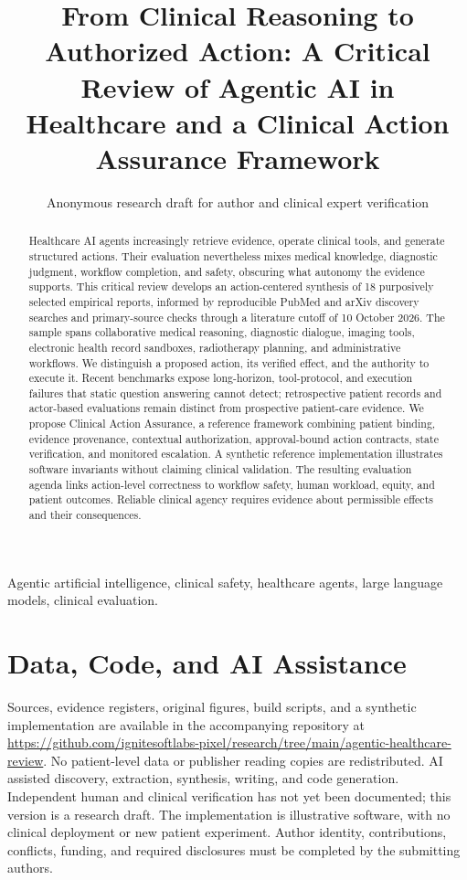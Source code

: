 \documentclass[journal,10pt]{IEEEtran}
\title{From Clinical Reasoning to Authorized Action: A Critical Review of Agentic AI in Healthcare and a Clinical Action Assurance Framework}
\author{Anonymous research draft for author and clinical expert verification}
\begin{document}
\maketitle
\raggedbottom
{}
\begin{abstract}
Healthcare AI agents increasingly retrieve evidence, operate clinical tools, and generate structured actions. Their evaluation nevertheless mixes medical knowledge, diagnostic judgment, workflow completion, and safety, obscuring what autonomy the evidence supports. This critical review develops an action-centered synthesis of 18 purposively selected empirical reports, informed by reproducible PubMed and arXiv discovery searches and primary-source checks through a literature cutoff of 10 October 2026. The sample spans collaborative medical reasoning, diagnostic dialogue, imaging tools, electronic health record sandboxes, radiotherapy planning, and administrative workflows. We distinguish a proposed action, its verified effect, and the authority to execute it. Recent benchmarks expose long-horizon, tool-protocol, and execution failures that static question answering cannot detect; retrospective patient records and actor-based evaluations remain distinct from prospective patient-care evidence. We propose Clinical Action Assurance, a reference framework combining patient binding, evidence provenance, contextual authorization, approval-bound action contracts, state verification, and monitored escalation. A synthetic reference implementation illustrates software invariants without claiming clinical validation. The resulting evaluation agenda links action-level correctness to workflow safety, human workload, equity, and patient outcomes. Reliable clinical agency requires evidence about permissible effects and their consequences.
\end{abstract}
\begin{IEEEkeywords}
Agentic artificial intelligence, clinical safety, healthcare agents, large language models, clinical evaluation.
\end{IEEEkeywords}









\section*{Data, Code, and AI Assistance}
Sources, evidence registers, original figures, build scripts, and a synthetic implementation are available in the accompanying repository at \url{https://github.com/ignitesoftlabs-pixel/research/tree/main/agentic-healthcare-review}. No patient-level data or publisher reading copies are redistributed. AI assisted discovery, extraction, synthesis, writing, and code generation. Independent human and clinical verification has not yet been documented; this version is a research draft. The implementation is illustrative software, with no clinical deployment or new patient experiment. Author identity, contributions, conflicts, funding, and required disclosures must be completed by the submitting authors.


\end{document}
